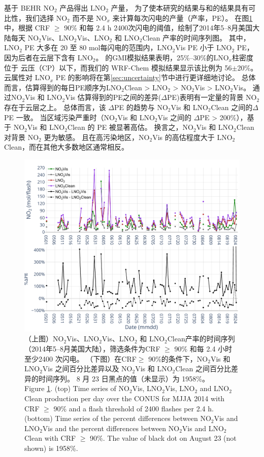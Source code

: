 \citet{Lapierre.2020}基于 BEHR NO$_2$ 产品得出 LNO$_2$ 产量，
为了使本研究的结果与\citet{Pickering.2016}和\citet{Lapierre.2020}的结果具有可比性，我们选择 NO$_2$  而不是 NO$_x$  来计算每次闪电的产量（产率，PE）。
在图\ref{fig:us_pe_timeseries}中，根据 CRF $\geq$ 90\% 和每 2.4 h 2400次闪电的阈值，绘制了2014年5--8月美国大陆每天 NO$_2$Vis、LNO$_2$Vis、LNO$_2$ 和 LNO$_2$Clean 产率的时间序列图。
其中，LNO$_2$ PE 大多在 20 至 80 mol每闪电的范围内，LNO$_2$Vis PE 小于 LNO$_2$ PE，因为后者在云层下含有 LNO$_2$。
\citet{Pickering.2016}的GMI模拟结果表明，25\%--30\%的LNO$_x$柱密度位于 云压（CP）以下，而我们的 WRF-Chem 模拟结果显示该比例为 56$\pm$20\%。
云属性对 LNO$_x$ PE 的影响将在第\ref{sec:uncertainty}节中进行更详细地讨论。
总体而言，估算得到的每日PE顺序为LNO$_2$Clean > LNO$_2$ > NO$_2$Vis > LNO$_2$Vis。
通过NO$_2$Vis 和 LNO$_2$Vis 估算得到的PE之间的差异($\Delta$PE)表明有一定量的背景 NO$_2$ 存在于云层之上。
总体而言，该 $\Delta$PE 的趋势与 NO$_2$Vis 和 LNO$_2$Clean 之间的$\Delta$PE 一致。
当区域污染严重时（NO$_2$Vis 和 LNO$_2$Vis 之间的 $\Delta$PE > 200\%），基于 NO$_2$Vis 和 LNO$_2$Clean 的 PE 被显著高估。
换言之，NO$_2$Vis 和 LNO$_2$Clean 对背景 NO$_2$ 更为敏感。
且在高污染地区，NO$_2$Vis 的高估程度大于 LNO$_2$Clean，而在其他大多数地区通常相反。

\begin{figure}[htbp]
\centering
\includegraphics[width=12cm]{./figures/us_pe_timeseries.pdf}
\caption{（上图）NO$_2$Vis、LNO$_2$Vis、LNO$_2$ 和 LNO$_2$Clean产率的时间序列（2014年5--8月美国大陆），筛选条件为CRF $\geq$ 90\% 和每 2.4 小时 至少2400 次闪电。
（下图）在CRF$\geq$ 90\%的条件下，NO$_2$Vis 和 LNO$_2$Vis 之间百分比差异以及 NO$_2$Vis 和 LNO$_2$Clean 之间百分比差异的时间序列。
8 月 23 日黑点的值（未显示）为 1958\%。\\
Figure \ref{fig:us_pe_timeseries}. (top) Time series of NO$_2$Vis, LNO$_2$Vis, LNO$_2$ and LNO$_2$Clean production per day over the CONUS for MJJA 2014 with CRF $\geq$ 90\% and a flash threshold of 2400 flashes per 2.4 h.
(bottom) Time series of the percent differences between NO$_2$Vis and LNO$_2$Vis and the percent differences between NO$_2$Vis and LNO$_2$Clean with CRF $\geq$ 90\%.
The value of black dot on August 23 (not shown) is 1958\%.}
\label{fig:us_pe_timeseries}
\end{figure}

